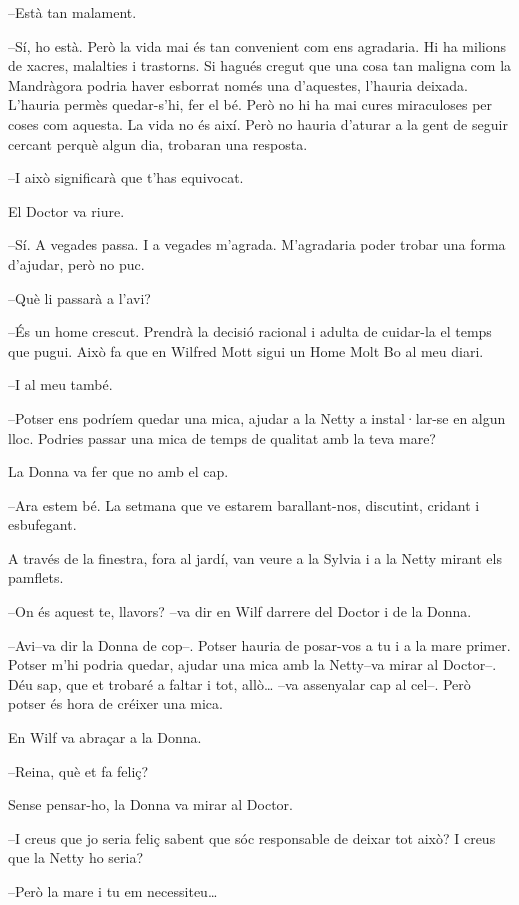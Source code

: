 --Està tan malament.

--Sí, ho està. Però la vida mai és tan convenient com ens agradaria. Hi
ha milions de xacres, malalties i trastorns. Si hagués cregut que una
cosa tan maligna com la Mandràgora podria haver esborrat només una
d'aquestes, l'hauria deixada. L'hauria permès quedar-s'hi, fer el bé.
Però no hi ha mai cures miraculoses per coses com aquesta. La vida no és
així. Però no hauria d'aturar a la gent de seguir cercant perquè algun
dia, trobaran una resposta.

--I això significarà que t'has equivocat.

El Doctor va riure.

--Sí. A vegades passa. I a vegades m'agrada. M'agradaria poder trobar
una forma d'ajudar, però no puc.

--Què li passarà a l'avi?

--És un home crescut. Prendrà la decisió racional i adulta de cuidar-la
el temps que pugui. Això fa que en Wilfred Mott sigui un Home Molt Bo al
meu diari.

--I al meu també.

--Potser ens podríem quedar una mica, ajudar a la Netty a instal·lar-se
en algun lloc. Podries passar una mica de temps de qualitat amb la teva
mare?

La Donna va fer que no amb el cap.

--Ara estem bé. La setmana que ve estarem barallant-nos, discutint,
cridant i esbufegant.

A través de la finestra, fora al jardí, van veure a la Sylvia i a la
Netty mirant els pamflets.

--On és aquest te, llavors? --va dir en Wilf darrere del Doctor i de la
Donna.

--Avi--va dir la Donna de cop--. Potser hauria de posar-vos a tu i a la
mare primer. Potser m'hi podria quedar, ajudar una mica amb la Netty--va
mirar al Doctor--. Déu sap, que et trobaré a faltar i tot, allò\ldots{}
--va assenyalar cap al cel--. Però potser és hora de créixer una mica.

En Wilf va abraçar a la Donna.

--Reina, què et fa feliç?

Sense pensar-ho, la Donna va mirar al Doctor.

--I creus que jo seria feliç sabent que sóc responsable de deixar tot
això? I creus que la Netty ho seria?

--Però la mare i tu em necessiteu\ldots{}


